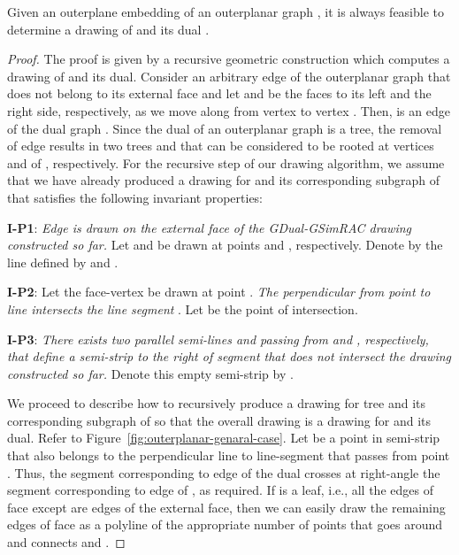 \documentclass{llncs}
\begin{document}
\begin{theorem}
\label{thm:outerplanar-dual}Given an outerplane embedding of an
outerplanar graph , it is always feasible to determine a 
drawing of  and its dual .
\end{theorem}

\begin{proof}
The proof is given by a recursive geometric construction which
computes a  drawing of  and its dual. Consider an
arbitrary edge  of the outerplanar graph that does not belong
to its external face and let  and  be the faces to its left
and the right side, respectively, as we move along  from
vertex  to vertex . Then,  is an edge of the dual graph
. Since the dual of an outerplanar graph is a tree, the removal
of edge  results in two trees  and  that can be
considered to be rooted at vertices  and  of ,
respectively. For the recursive step of our drawing algorithm, we
assume that we have already produced a  drawing for 
and its corresponding subgraph of  that satisfies the following
invariant properties:
\begin{description}
\item{\textbf{I-P1}:} \emph{Edge  is drawn on the external face of the GDual-GSimRAC drawing constructed so
far.} Let  and  be drawn at points  and ,
respectively. Denote by  the line defined by  and
.
\item{\textbf{I-P2}:} Let the face-vertex  be drawn at point . \emph{The perpendicular from point  to line 
intersects the line segment }. Let  be the point of
intersection.
\item{\textbf{I-P3}:} \emph{There exists two parallel semi-lines  and 
passing from  and , respectively, that define a semi-strip
to the right of segment  that does not intersect the drawing
constructed so far.} Denote this empty semi-strip by .
\end{description}

We proceed to describe how to recursively produce a drawing for tree
 and its corresponding subgraph of  so that the overall
drawing is a  drawing for  and its dual. Refer to
Figure~\ref{fig:outerplanar-genaral-case}. Let  be a point in
semi-strip  that also belongs to the perpendicular line to
line-segment  that passes from point . Thus, the segment
corresponding to edge  of the dual crosses at right-angle the
segment corresponding to edge  of , as required. If  is
a leaf, i.e., all the edges of face  except  are edges of
the external face, then we can easily draw the remaining edges of
face  as a polyline of the appropriate number of points that goes
around  and connects  and .


\end{proof}
\end{document}
